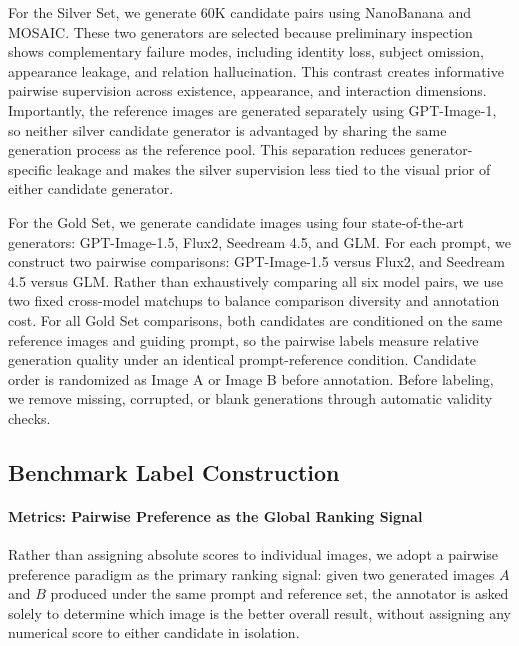 \documentclass{article}
\begin{document}
For the Silver Set, we generate 60K candidate pairs using NanoBanana and MOSAIC. These two generators are selected because preliminary inspection shows complementary failure modes, including identity loss, subject omission, appearance leakage, and relation hallucination. This contrast creates informative pairwise supervision across existence, appearance, and interaction dimensions. Importantly, the reference images are generated separately using GPT-Image-1, so neither silver candidate generator is advantaged by sharing the same generation process as the reference pool. This separation reduces generator-specific leakage and makes the silver supervision less tied to the visual prior of either candidate generator.

For the Gold Set, we generate candidate images using four state-of-the-art generators: GPT-Image-1.5, Flux2, Seedream 4.5, and GLM. For each prompt, we construct two pairwise comparisons: GPT-Image-1.5 versus Flux2, and Seedream 4.5 versus GLM. Rather than exhaustively comparing all six model pairs, we use two fixed cross-model matchups to balance comparison diversity and annotation cost. For all Gold Set comparisons, both candidates are conditioned on the same reference images and guiding prompt, so the pairwise labels measure relative generation quality under an identical prompt-reference condition. Candidate order is randomized as Image A or Image B before annotation. Before labeling, we remove missing, corrupted, or blank generations through automatic validity checks.


\subsection{Benchmark Label Construction}

\paragraph{Metrics: Pairwise Preference as the Global Ranking Signal}
Rather than assigning absolute scores to individual images, we adopt a pairwise preference paradigm as the primary ranking signal: given two generated images $A$ and $B$ produced under the same prompt and reference set, the annotator is asked solely to determine which image is the better overall result, without assigning any numerical score to either candidate in isolation.
\end{document}
